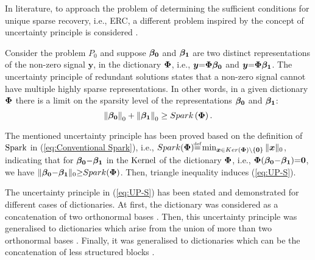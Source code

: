 
In literature, to approach the problem of determining the sufficient conditions for unique sparse recovery, i.e., ERC, a different problem inspired by the concept of uncertainty principle is considered \cite{Gorodnitsky1997,Donoho1989}.

Consider the problem $P_0$ and suppose $\boldsymbol{\beta_0}$ and $\boldsymbol{\beta_1}$ are two distinct representations of the non-zero signal $\boldsymbol{y}$, in the dictionary $\boldsymbol{\Phi}$, i.e., $\boldsymbol{y} {=} \boldsymbol{\Phi} \boldsymbol{\beta_0}$ and $\boldsymbol{y} {=} \boldsymbol{\Phi} \boldsymbol{\beta_1}$. 
The uncertainty principle of redundant solutions states that a non-zero signal cannot have multiple highly sparse representations. 
In other words, in a given dictionary $\boldsymbol{\Phi}$ there is a limit on the sparsity level of the representations $\boldsymbol{\beta_0}$ and $\boldsymbol{\beta_1}$:
\begin{equation}
\label{eq:UP-S}
\left\lVert\boldsymbol{\beta_0}\right\rVert_0 + \left\lVert\boldsymbol{\beta_1}\right\rVert_0 \geq Spark\left( \boldsymbol{\Phi} \right).
\end{equation}

The mentioned uncertainty principle has been proved based on the definition of $\mathrm{Spark}$ in (\ref{eq:Conventional Spark}), i.e., $\mySpk(\myPhi) {\myeq} \min_{\boldsymbol{x} \in \myKerMath \backslash\left\{\boldsymbol{0}\right\}} \Vert \boldsymbol{x} \Vert_{0}$, indicating that for $\boldsymbol{\beta_0} {-} \boldsymbol{\beta_1}$ in the $\mathrm{Kernel}$ of the dictionary $\boldsymbol{\Phi}$, i.e., $\boldsymbol{\Phi}(\boldsymbol{\beta_0} {-} \boldsymbol{\beta_1}) {=} \boldsymbol{0}$, we have
$\Vert \boldsymbol{\beta_0} {-} \boldsymbol{\beta_1} \Vert_0 {\geq} Spark(\boldsymbol{\Phi})$. 
Then, triangle inequality induces (\ref{eq:UP-S}).

The uncertainty principle in (\ref{eq:UP-S}) has been stated and demonstrated for different cases of dictionaries. 
At first, the dictionary was considered as a concatenation of two orthonormal bases \cite{Donoho2001,Elad2001,Elad2002a}.
Then, this uncertainty principle was generalised to dictionaries which arise from the union of more than two orthonormal bases \cite{Gribonval2003a}. 
Finally, it was generalised to dictionaries which can be the concatenation of less structured blocks 
\cite{Donoho2003,Donoho2003a,Gribonval2003}.


